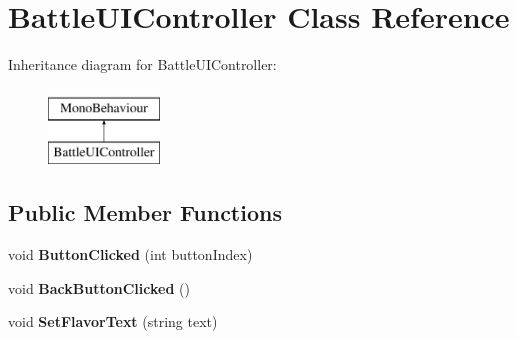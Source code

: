 \hypertarget{class_battle_u_i_controller}{\section{Battle\-U\-I\-Controller Class Reference}
\label{class_battle_u_i_controller}
}
Inheritance diagram for Battle\-U\-I\-Controller\-:\begin{figure}[H]
\begin{center}
\leavevmode
\includegraphics[height=2.000000cm]{class_battle_u_i_controller}
\end{center}
\end{figure}
\subsection*{Public Member Functions}
\begin{DoxyCompactItemize}
\item 
\hypertarget{class_battle_u_i_controller_a3a85307f98994f49ffcb122ad836895f}{void {\bfseries Button\-Clicked} (int button\-Index)}\label{class_battle_u_i_controller_a3a85307f98994f49ffcb122ad836895f}

\item 
\hypertarget{class_battle_u_i_controller_a7cdd677370faa1526e0774b2b070e6fd}{void {\bfseries Back\-Button\-Clicked} ()}\label{class_battle_u_i_controller_a7cdd677370faa1526e0774b2b070e6fd}

\item 
\hypertarget{class_battle_u_i_controller_a05427e5dab5da5027fd3f12526e7d98c}{void {\bfseries Set\-Flavor\-Text} (string text)}\label{class_battle_u_i_controller_a05427e5dab5da5027fd3f12526e7d98c}

\end{DoxyCompactItemize}
